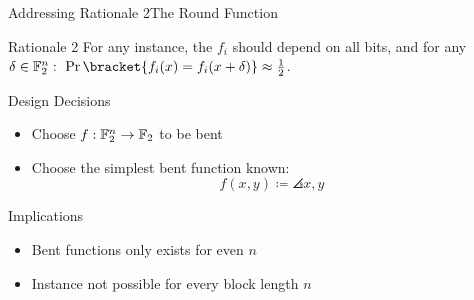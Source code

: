 \begin{frame}{Addressing Rationale 2}{The Round Function}
    \vspace{-60pt}
    \begin{minipage}{0.985\textwidth}
    \begin{exampleblock}{Rationale 2}
        For any instance, the $f_i$ should depend on all bits, and for any $\delta \in \F_2^n:\ \Pr\bracket{f_i(x) = f_i(x + \delta)} \approx \frac{1}{2}$.
    \end{exampleblock}
    \end{minipage}

    \begin{minipage}[t][85pt][t]{0.47\textwidth}
        \begin{block}{Design Decisions}
            \begin{itemize}
                \item Choose $f : \mathbb{F}_2^n \to \mathbb{F}_2$ to be bent
                \item Choose the simplest bent function known:
                    \begin{equation*}
                        f(x, y) \coloneqq \angles{x, y}
                    \end{equation*}
            \end{itemize}
        \end{block}
    \end{minipage}
    \hfill
    \begin{minipage}[t][85pt][t]{0.47\textwidth}
        \begin{block}{Implications}
            \begin{itemize}
                \item Bent functions only exists for even $n$\\[5pt]
                \item Instance not possible for every block length $n$
            \end{itemize}
        \end{block}
    \end{minipage}
\end{frame}

